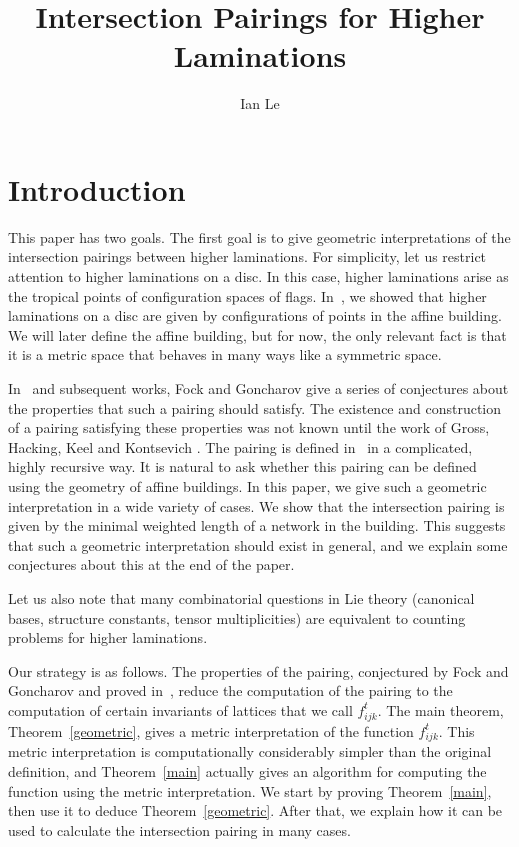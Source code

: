 \documentclass[10pt]{amsart}
\title{Intersection Pairings for Higher Laminations}
\author{Ian Le}
\theoremstyle{definition}
\begin{document}
\maketitle
\section{Introduction}

This paper has two goals. The first goal is to give geometric interpretations of the intersection pairings between higher laminations. For simplicity, let us restrict attention to higher laminations on a disc. In this case, higher laminations arise as the tropical points of configuration spaces of flags. In~\cite{Le}, we showed that higher laminations on a disc are given by configurations of points in the affine building. We will later define the affine building, but for now, the only relevant fact is that it is a metric space that behaves in many ways like a symmetric space.

In~\cite{FG1} and subsequent works, Fock and Goncharov give a series of conjectures about the properties that such a pairing should satisfy. The existence and construction of a pairing satisfying these properties was not known until the work of Gross, Hacking, Keel and Kontsevich \cite{GHKK}. The pairing is defined in~\cite{GHKK} in a complicated, highly recursive way. It is natural to ask whether this pairing can be defined using the geometry of affine buildings. In this paper, we give such a geometric interpretation in a wide variety of cases. We show that the intersection pairing is given by the minimal weighted length of a network in the building. This suggests that such a geometric interpretation should exist in general, and we explain some conjectures about this at the end of the paper.

Let us also note that many combinatorial questions in Lie theory (canonical bases, structure constants, tensor multiplicities) are equivalent to counting problems for higher laminations.

Our strategy is as follows. The properties of the pairing, conjectured by Fock and Goncharov and proved in~\cite{GHKK}, reduce the computation of the pairing to the computation of certain invariants of lattices that we call $f_{ijk}^t$. The main theorem, Theorem~\ref{geometric}, gives a metric interpretation of the function $f_{ijk}^t$. This metric interpretation is computationally considerably simpler than the original definition, and Theorem~\ref{main} actually gives an algorithm for computing the function using the metric interpretation. We start by proving Theorem~\ref{main}, then use it to deduce Theorem~\ref{geometric}. After that, we explain how it can be used to calculate the intersection pairing in many cases.
\end{document}
